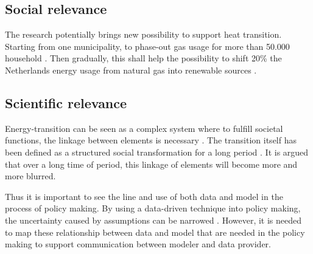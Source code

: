 \subsection{Social relevance}
The research potentially brings new possibility to support heat transition. Starting from one municipality\citep{ZoetermeerMunicipality2019AardgasvrijWonen}, to phase-out gas usage  for more than 50.000 household \citep{ZoetermeerMunicipality2019MunicipalityFigures}. Then gradually, this shall help the possibility to shift 20\% the Netherlands energy usage from natural gas into renewable sources \citep{Eurostat2019Eurostat:Explained, WorldData2019EnergyNetherlands, CBS2019TrendEnerg}.

\smallskip{}


\subsection{Scientific relevance}
Energy-transition can be seen as a complex system where to fulfill societal functions, the linkage between elements is necessary \citep{Geels2004FromTheory,VanDam2013Agent-BasedSystems}. The transition itself has been defined as a structured social transformation for a long period \citep{Rotmans2001TransitionsSupply}. It is argued that over a long time of period, this linkage of elements will become more and more blurred.


Thus it is important to see the line and use of both data and model in the process of policy making. By using a data-driven technique into policy making, the uncertainty caused by assumptions can be narrowed \citep{Ameyaw2018SectoralTechnique, Ma2018ForecastingAssumptions}. However, it is needed to map these relationship between data and model that are needed in the policy making to support communication between modeler and data provider.  


